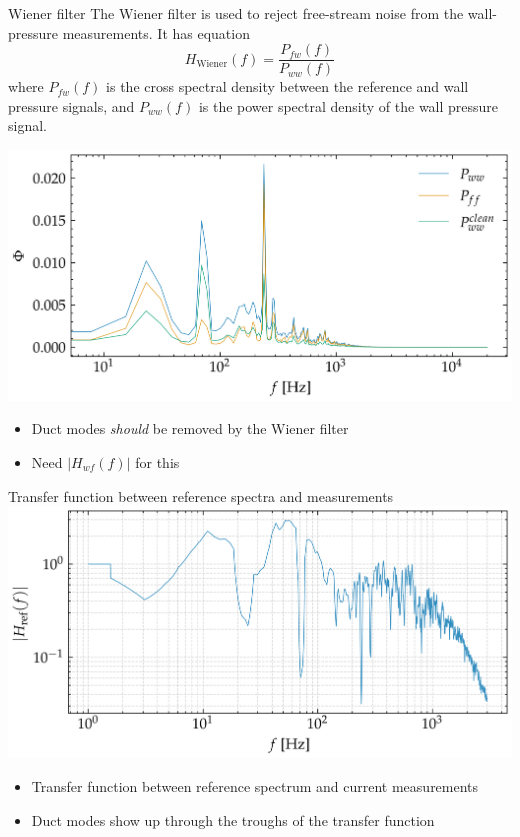 \documentclass[aspectratio=169]{beamer}
\begin{document}
\begin{frame}{Wiener filter}
    The Wiener filter is used to reject free-stream noise from the wall-pressure measurements. It has equation
    \begin{equation}
        H_{\text{Wiener}}(f) = \frac{P_{fw}(f)}{P_{ww}(f)}
    \end{equation}
    where $P_{fw}(f)$ is the cross spectral density between the reference and wall pressure signals, and $P_{ww}(f)$ is the power spectral density of the wall pressure signal.
    \begin{minipage}{0.6\textwidth}
        \centering
        \includegraphics[width=\linewidth]{figures/wiener_filtered_spectrum.png}
    \end{minipage}
    \begin{minipage}{0.35\textwidth}
        \centering
        \begin{itemize}
            \item Duct modes \emph{should} be removed by the Wiener filter
            \item Need $|H_{wf}(f)|$ for this
        \end{itemize}
    \end{minipage}
\end{frame}


\begin{frame}{Transfer function between reference spectra and measurements}
    \centering
    \includegraphics[width=0.7\linewidth]{figures/reference_transfer_function.png}
    \begin{itemize}
        \centering
        \item Transfer function between reference spectrum \citep{deshpande_active_2025} and current measurements
        \item Duct modes show up through the troughs of the transfer function
    \end{itemize}
\end{frame}
\end{document}
